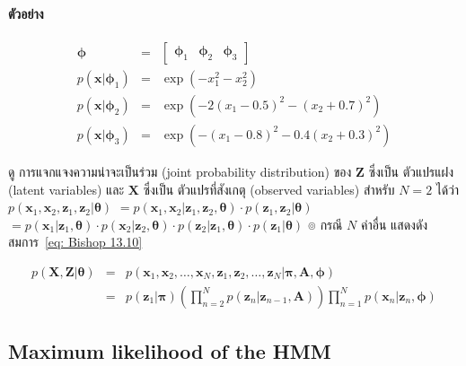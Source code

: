 \paragraph{ตัวอย่าง}

\begin{eqnarray}
\bm{\phi} &=&
\left[ 
\begin{array}{ccc}
\bm{\phi}_1 &
\bm{\phi}_2 &
\bm{\phi}_3  
\end{array} 
\right]
\nonumber \\
p(\textbf{x} | \bm{\phi}_1) &=& 
\exp ( - x_1^2 - x_2^2 ) 
\nonumber \\
p(\textbf{x} | \bm{\phi}_2) &=& 
\exp ( - 2 (x_1 - 0.5) ^2 - (x_2 + 0.7)^2 ) 
\nonumber \\
p(\textbf{x} | \bm{\phi}_3) &=& 
\exp ( - (x_1 - 0.8) ^2 - 0.4 (x_2 + 0.3)^2 ) 
\nonumber
\end{eqnarray}

ดู การแจกแจงความน่าจะเป็นร่วม (joint probability distribution) ของ $\textbf{Z}$ ซึ่งเป็น ตัวแปรแฝง (latent variables) และ $\textbf{X}$ ซึ่งเป็น ตัวแปรที่สังเกตุ (observed variables) สำหรับ $N=2$ ได้ว่า $p(\textbf{x}_1, \textbf{x}_2, \textbf{z}_1, \textbf{z}_2|\bm{\theta})$
$= p(\textbf{x}_1, \textbf{x}_2|\textbf{z}_1, \textbf{z}_2, \bm{\theta}) \cdot p(\textbf{z}_1, \textbf{z}_2|\bm{\theta})$ 
$=p(\textbf{x}_1|\textbf{z}_1, \bm{\theta}) \cdot p(\textbf{x}_2|\textbf{z}_2, \bm{\theta}) \cdot p(\textbf{z}_2|\textbf{z}_1,\bm{\theta}) \cdot p(\textbf{z}_1|\bm{\theta})$
๏ กรณี $N$ ค่าอื่น แสดงดัง สมการ~\ref{eq: Bishop 13.10}

\begin{eqnarray}
p(\textbf{X}, \textbf{Z}|\bm{\theta}) &=& p(\textbf{x}_1, \textbf{x}_2, \ldots, \textbf{x}_N, \textbf{z}_1, \textbf{z}_2, \ldots , \textbf{z}_N|\bm{\pi}, \textbf{A}, \bm{\phi})
\nonumber \\
&=& p(\textbf{z}_1|\bm{\pi}) \left( \prod_{n=2}^N p(\textbf{z}_n | \textbf{z}_{n-1}, \textbf{A}) \right) \prod_{n=1}^N p(\textbf{x}_n|\textbf{z}_n, \bm{\phi})
\label{eq: Bishop 13.10}
\end{eqnarray}

\subsection{Maximum likelihood of the HMM}

